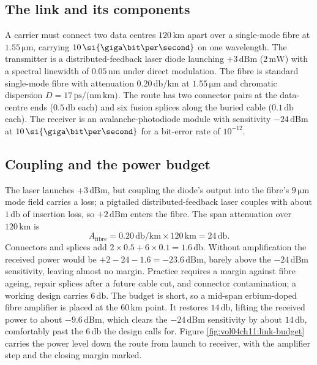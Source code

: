 \subsection{The link and its components}

A carrier must connect two data centres $120\,\si{\kilo\meter}$ apart over a
single-mode fibre at $1.55\,\si{\micro\meter}$, carrying
$10\,\si{\giga\bit\per\second}$ on one wavelength. The transmitter is a
distributed-feedback laser diode launching $+3\,\text{dBm}$
($2\,\si{\milli\watt}$) with a spectral linewidth of
$0.05\,\si{\nano\meter}$ under direct modulation. The fibre is standard
single-mode fibre with attenuation $0.20\,\si{\decibel\per\kilo\meter}$ at
$1.55\,\si{\micro\meter}$ and chromatic dispersion
$D = 17\,\si{\pico\second/(\nano\meter\,\kilo\meter)}$. The route has two
connector pairs at the data-centre ends ($0.5\,\si{\decibel}$ each) and six
fusion splices along the buried cable ($0.1\,\si{\decibel}$ each). The
receiver is an avalanche-photodiode module with sensitivity
$-24\,\text{dBm}$ at $10\,\si{\giga\bit\per\second}$ for a bit-error rate of
$10^{-12}$.

\subsection{Coupling and the power budget}

The laser launches $+3\,\text{dBm}$, but coupling the diode's output into the
fibre's $9\,\si{\micro\meter}$ mode field carries a loss; a pigtailed
distributed-feedback laser couples with about $1\,\si{\decibel}$ of insertion
loss, so $+2\,\text{dBm}$ enters the fibre. The span attenuation over
$120\,\si{\kilo\meter}$ is
\[
A_{\text{fibre}} = 0.20\,\si{\decibel\per\kilo\meter}\times 120\,\si{\kilo
\meter} = 24\,\si{\decibel}.
\]
Connectors and splices add
$2\times 0.5 + 6\times 0.1 = 1.6\,\si{\decibel}$. Without amplification the
received power would be $+2 - 24 - 1.6 = -23.6\,\text{dBm}$, barely above the
$-24\,\text{dBm}$ sensitivity, leaving almost no margin. Practice
requires a margin against fibre ageing, repair splices after a future cable
cut, and connector contamination; a working design carries
$6\,\si{\decibel}$. The budget is short, so a mid-span erbium-doped fibre
amplifier is placed at the $60\,\si{\kilo\meter}$ point. It restores
$14\,\si{\decibel}$, lifting the received power to about $-9.6\,\text{dBm}$,
which clears the $-24\,\text{dBm}$ sensitivity by about $14\,\si{\decibel}$,
comfortably past the $6\,\si{\decibel}$ the design calls for. Figure
\ref{fig:vol04ch11:link-budget} carries the power level down the route from
launch to receiver, with the amplifier step and the closing margin marked.

